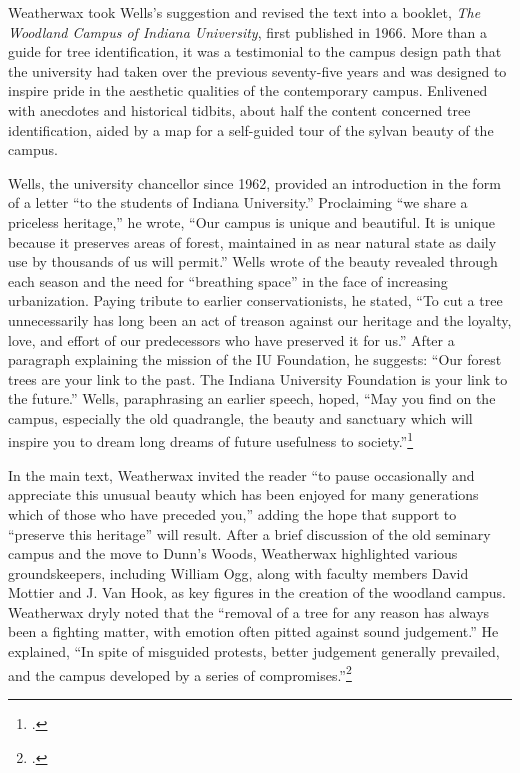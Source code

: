 \documentclass[
  american,
  letterpaper,
]{scrreprt}
\begin{document}
Weatherwax took Wells's suggestion and revised the text into a booklet,
\emph{The Woodland Campus of Indiana University}, first published in
1966. More than a guide for tree identification, it was a testimonial to
the campus design path that the university had taken over the previous
seventy-five years and was designed to inspire pride in the aesthetic
qualities of the contemporary campus. Enlivened with anecdotes and
historical tidbits, about half the content concerned tree
identification, aided by a map for a self-guided tour of the sylvan
beauty of the campus.

Wells, the university chancellor since 1962, provided an introduction in
the form of a letter ``to the students of Indiana University.''
Proclaiming ``we share a priceless heritage,'' he wrote, ``Our campus is
unique and beautiful. It is unique because it preserves areas of forest,
maintained in as near natural state as daily use by thousands of us will
permit.'' Wells wrote of the beauty revealed through each season and the
need for ``breathing space'' in the face of increasing urbanization.
Paying tribute to earlier conservationists, he stated, ``To cut a tree
unnecessarily has long been an act of treason against our heritage and
the loyalty, love, and effort of our predecessors who have preserved it
for us.'' After a paragraph explaining the mission of the IU Foundation,
he suggests: ``Our forest trees are your link to the past. The Indiana
University Foundation is your link to the future.'' Wells, paraphrasing
an earlier speech, hoped, ``May you find on the campus, especially the
old quadrangle, the beauty and sanctuary which will inspire you to dream
long dreams of future usefulness to society.''\footnote{.}

In the main text, Weatherwax invited the reader ``to pause occasionally
and appreciate this unusual beauty which has been enjoyed for many
generations which of those who have preceded you,'' adding the hope that
support to ``preserve this heritage'' will result. After a brief
discussion of the old seminary campus and the move to Dunn's Woods,
Weatherwax highlighted various groundskeepers, including William Ogg,
along with faculty members David Mottier and J. Van Hook, as key figures
in the creation of the woodland campus. Weatherwax dryly noted that the
``removal of a tree for any reason has always been a fighting matter,
with emotion often pitted against sound judgement.'' He explained, ``In
spite of misguided protests, better judgement generally prevailed, and
the campus developed by a series of compromises.''\footnote{.}
\end{document}
